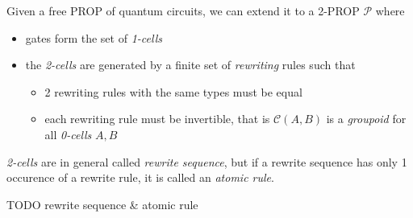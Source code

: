\documentclass[a4paper]{article}
\begin{document}
\begin{definition}
  Given a free PROP of quantum circuits, we can extend it to a 2-PROP
    $\mathcal{P}$ where
  \begin{itemize}
    \item gates form the set of \emph{1-cells} 
    \item the \emph{2-cells} are generated by a finite set of \emph{rewriting}
      rules such that
    \begin{itemize}
      \item 2 rewriting rules with the same types must be equal
      \item each rewriting rule must be invertible, that is $\mathcal{C}(A, B)$
        is a \emph{groupoid} for all \emph{0-cells} $A, B$
    \end{itemize}
  \end{itemize}
  
  \emph{2-cells} are in general called \emph{rewrite sequence}, but if a rewrite
    sequence has only 1 occurence of a rewrite rule, it is called an
    \emph{atomic rule}.
\end{definition}

\begin{example}
  TODO rewrite sequence \& atomic rule
\end{example}
\end{document}
